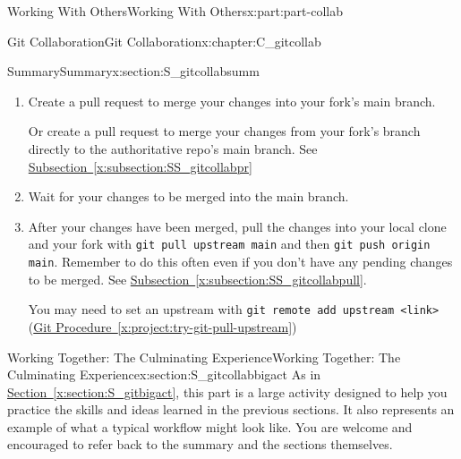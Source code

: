 \documentclass[oneside,10pt,]{book}
\newcommand{\xreffont}{\relax}
\newcommand{\mono}[1]{\texttt{#1}}
\begin{document}
\begin{partptx}{Working With Others}{}{Working With Others}{}{}{x:part:part-collab}
\begin{chapterptx}{Git Collaboration}{}{Git Collaboration}{}{}{x:chapter:C_gitcollab}
\begin{sectionptx}{Summary}{}{Summary}{}{}{x:section:S_gitcollabsumm}
\begin{enumerate}
\begin{enumerate}
\item{}Commit your files with \mono{git commit -m}. See \hyperref[x:subsection:SS_git-commit]{Subsection~{\xreffont\ref{x:subsection:SS_git-commit}}} and \hyperref[x:project:try-git-commit]{Git Procedure~{\xreffont\ref{x:project:try-git-commit}}}.%
\item{}Push your files back to your fork on GitHub (on your current branch) with \mono{git push origin}. See \hyperref[x:subsection:SS_git-push]{Subsection~{\xreffont\ref{x:subsection:SS_git-push}}}, \hyperref[x:subsection:SS_gitcollabpush]{Subsection~{\xreffont\ref{x:subsection:SS_gitcollabpush}}} and \hyperref[x:project:try-git-push]{Git Procedure~{\xreffont\ref{x:project:try-git-push}}}.%
\end{enumerate}
%
\item{}Create a pull request to merge your changes into your fork's main branch.%
\par
Or create a pull request to merge your changes from your fork's branch directly to the authoritative repo's main branch. See \hyperref[x:subsection:SS_gitcollabpr]{Subsection~{\xreffont\ref{x:subsection:SS_gitcollabpr}}}%
\item{}Wait for your changes to be merged into the main branch.%
\item{}After your changes have been merged, pull the changes into your local clone and your fork with \mono{git pull upstream main} and then \mono{git push origin main}. Remember to do this often even if you don't have any pending changes to be merged. See \hyperref[x:subsection:SS_gitcollabpull]{Subsection~{\xreffont\ref{x:subsection:SS_gitcollabpull}}}.%
\par
You may need to set an upstream with \mono{git remote add upstream <link>} (\hyperref[x:project:try-git-pull-upstream]{Git Procedure~{\xreffont\ref{x:project:try-git-pull-upstream}}})%
\end{enumerate}
%
\end{sectionptx}
%
%
\typeout{************************************************}
\typeout{************************************************}
%
\begin{sectionptx}{Working Together: The Culminating Experience}{}{Working Together: The Culminating Experience}{}{}{x:section:S_gitcollabbigact}
%
As in \hyperref[x:section:S_gitbigact]{Section~{\xreffont\ref{x:section:S_gitbigact}}}, this part is a large activity designed to help you practice the skills and ideas learned in the previous sections. It also represents an example of what a typical workflow might look like. You are welcome and encouraged to refer back to the summary and the sections themselves.%

\end{sectionptx}
\end{chapterptx}
\end{partptx}
\end{document}
